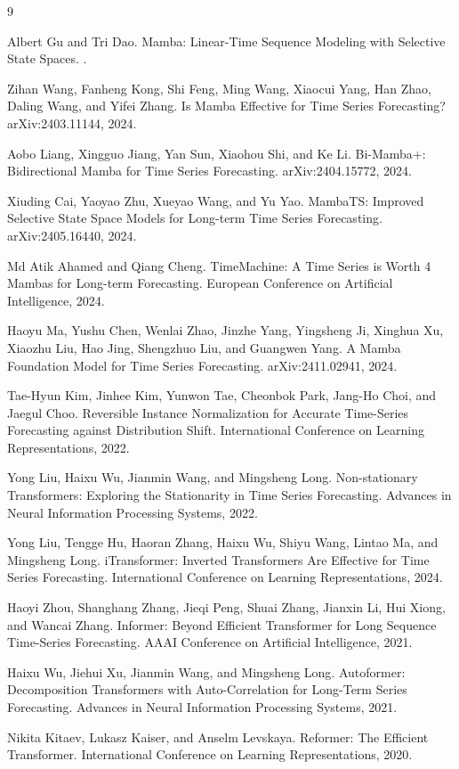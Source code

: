 \begin{thebibliography}{9}

Albert Gu and Tri Dao.
\newblock Mamba: Linear-Time Sequence Modeling with Selective State Spaces.
.

Zihan Wang, Fanheng Kong, Shi Feng, Ming Wang, Xiaocui Yang, Han Zhao, Daling Wang, and Yifei Zhang.
\newblock Is Mamba Effective for Time Series Forecasting?
\newblock arXiv:2403.11144, 2024.

Aobo Liang, Xingguo Jiang, Yan Sun, Xiaohou Shi, and Ke Li.
\newblock Bi-Mamba+: Bidirectional Mamba for Time Series Forecasting.
\newblock arXiv:2404.15772, 2024.

Xiuding Cai, Yaoyao Zhu, Xueyao Wang, and Yu Yao.
\newblock MambaTS: Improved Selective State Space Models for Long-term Time Series Forecasting.
\newblock arXiv:2405.16440, 2024.

Md Atik Ahamed and Qiang Cheng.
\newblock TimeMachine: A Time Series is Worth 4 Mambas for Long-term Forecasting.
\newblock European Conference on Artificial Intelligence, 2024.

Haoyu Ma, Yushu Chen, Wenlai Zhao, Jinzhe Yang, Yingsheng Ji, Xinghua Xu, Xiaozhu Liu, Hao Jing, Shengzhuo Liu, and Guangwen Yang.
\newblock A Mamba Foundation Model for Time Series Forecasting.
\newblock arXiv:2411.02941, 2024.

Tae-Hyun Kim, Jinhee Kim, Yunwon Tae, Cheonbok Park, Jang-Ho Choi, and Jaegul Choo.
\newblock Reversible Instance Normalization for Accurate Time-Series Forecasting against Distribution Shift.
\newblock International Conference on Learning Representations, 2022.

Yong Liu, Haixu Wu, Jianmin Wang, and Mingsheng Long.
\newblock Non-stationary Transformers: Exploring the Stationarity in Time Series Forecasting.
\newblock Advances in Neural Information Processing Systems, 2022.

Yong Liu, Tengge Hu, Haoran Zhang, Haixu Wu, Shiyu Wang, Lintao Ma, and Mingsheng Long.
\newblock iTransformer: Inverted Transformers Are Effective for Time Series Forecasting.
\newblock International Conference on Learning Representations, 2024.

Haoyi Zhou, Shanghang Zhang, Jieqi Peng, Shuai Zhang, Jianxin Li, Hui Xiong, and Wancai Zhang.
\newblock Informer: Beyond Efficient Transformer for Long Sequence Time-Series Forecasting.
\newblock AAAI Conference on Artificial Intelligence, 2021.

Haixu Wu, Jiehui Xu, Jianmin Wang, and Mingsheng Long.
\newblock Autoformer: Decomposition Transformers with Auto-Correlation for Long-Term Series Forecasting.
\newblock Advances in Neural Information Processing Systems, 2021.

Nikita Kitaev, Lukasz Kaiser, and Anselm Levskaya.
\newblock Reformer: The Efficient Transformer.
\newblock International Conference on Learning Representations, 2020.

\end{thebibliography}
